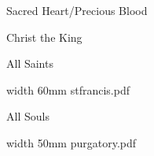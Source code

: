 \bigskip

\eject


\paginaproxima

\beginpart Sacred Heart/Precious Blood



\bigskip



\bigskip



\eject

\beginpart Christ the King


\bigskip




%

\bigskip


\eject

\beginpart All Saints



\bigskip



\eject



\bigskip

\saveimageresource width 60mm {stfrancis.pdf}

\centerline{\useimageresource \lastsavedimageresourceindex}



\eject

\beginpart All Souls



\paginaproxima


\bigskip

\saveimageresource width 50mm {purgatory.pdf}

\centerline{\useimageresource \lastsavedimageresourceindex}



\eject

